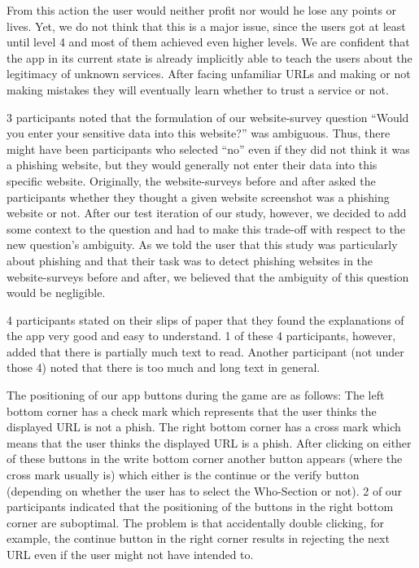 \begin{description}[leftmargin=0cm]
From this action the user would neither profit nor would he lose any points or lives.
Yet, we do not think that this is a major issue, since the users got at least until level 4 and most of them achieved even higher levels.
We are confident that the app in its current state is already implicitly able to teach the users about the legitimacy of unknown services.
After facing unfamiliar URLs and making or not making mistakes they will eventually learn whether to trust a service or not.
	\item[Question to Data Entry:] 3 participants noted that the formulation of our website-survey question ``Would you enter your sensitive data into this website?'' was ambiguous.
Thus, there might have been participants who selected ``no'' even if they did not think it was a phishing website, but they would generally not enter their data into this specific website.
Originally, the website-surveys before and after asked the participants whether they thought a given website screenshot was a phishing website or not.
After our test iteration of our study, however, we decided to add some context to the question and had to make this trade-off with respect to the new question's ambiguity.
As we told the user that this study was particularly about phishing and that their task was to detect phishing websites in the website-surveys before and after, we believed that the ambiguity of this question would be negligible.
	\item[Explanations and Comprehensibility:]
4 participants stated on their slips of paper that they found the explanations of the app very good and easy to understand.
1 of these 4 participants, however, added that there is partially much text to read.
Another participant (not under those 4) noted that there is too much and long text in general.
	\item[Button Positioning:] The positioning of our app buttons during the game are as follows: 
The left bottom corner has a check mark which represents that the user thinks the displayed URL is not a phish.
The right bottom corner has a cross mark which means that the user thinks the displayed URL is a phish.
After clicking on either of these buttons in the write bottom corner another button appears (where the cross mark usually is) which either is the continue or the verify button (depending on whether the user has to select the Who-Section or not).
2 of our participants indicated that the positioning of the buttons in the right bottom corner are suboptimal.
The problem is that accidentally double clicking, for example, the continue button in the right corner results in rejecting the next URL even if the user might not have intended to.

\end{description}
